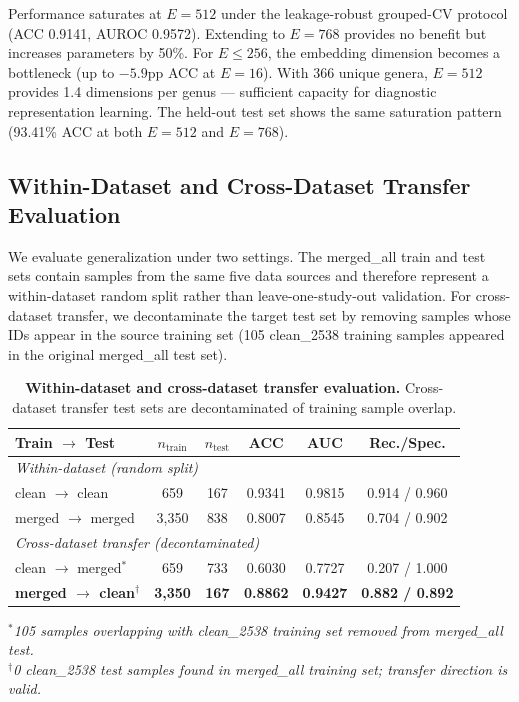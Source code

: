 \documentclass[11pt,a4paper]{article}
\begin{document}
Performance saturates at $E{=}512$ under the leakage-robust grouped-CV protocol (ACC 0.9141, AUROC 0.9572). Extending to $E{=}768$ provides no benefit but increases parameters by 50\%. For $E{\leq}256$, the embedding dimension becomes a bottleneck (up to $-5.9$pp ACC at $E{=}16$). With 366 unique genera, $E{=}512$ provides 1.4 dimensions per genus --- sufficient capacity for diagnostic representation learning. The held-out test set shows the same saturation pattern (93.41\% ACC at both $E{=}512$ and $E{=}768$).

\subsection{Within-Dataset and Cross-Dataset Transfer Evaluation}

We evaluate generalization under two settings. The merged\_all train and test sets contain samples from the same five data sources and therefore represent a within-dataset random split rather than leave-one-study-out validation. For cross-dataset transfer, we decontaminate the target test set by removing samples whose IDs appear in the source training set (105 clean\_2538 training samples appeared in the original merged\_all test set).

\begin{table}[ht]
\centering
\caption{\textbf{Within-dataset and cross-dataset transfer evaluation.}
Cross-dataset transfer test sets are decontaminated of training sample overlap.}
\label{tab:transfer}
\begin{tabular}{lccccc}
\toprule
\textbf{Train $\rightarrow$ Test} & \textbf{$n_\text{train}$} & \textbf{$n_\text{test}$} & \textbf{ACC} & \textbf{AUC} & \textbf{Rec./Spec.} \\
\midrule
\multicolumn{6}{l}{\textit{Within-dataset (random split)}} \\
\;\; clean $\rightarrow$ clean & 659 & 167 & 0.9341 & 0.9815 & 0.914 / 0.960 \\
\;\; merged $\rightarrow$ merged & 3,350 & 838 & 0.8007 & 0.8545 & 0.704 / 0.902 \\
\midrule
\multicolumn{6}{l}{\textit{Cross-dataset transfer (decontaminated)}} \\
\;\; clean $\rightarrow$ merged$^*$ & 659 & 733 & 0.6030 & 0.7727 & 0.207 / 1.000 \\
\;\; \textbf{merged $\rightarrow$ clean$^\dagger$} & \textbf{3,350} & \textbf{167} & \textbf{0.8862} & \textbf{0.9427} & \textbf{0.882 / 0.892} \\
\bottomrule
\end{tabular}

\vspace{4pt}
\textit{$^*$105 samples overlapping with clean\_2538 training set removed from merged\_all test.\\
$^\dagger$0 clean\_2538 test samples found in merged\_all training set; transfer direction is valid.}
\end{table}
\end{document}
